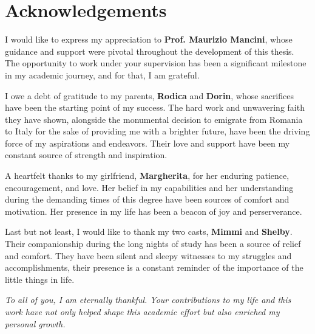 %
%
\chapter*{Acknowledgements}


    I would like to express my appreciation to \textbf{Prof. Maurizio Mancini}, whose guidance
    and support were pivotal throughout the development of this thesis. The opportunity to work under 
    your supervision has been a significant milestone in my academic journey, and for that, I am grateful.  
   
    \vspace{2mm} 
    
    \noindent I owe a debt of gratitude to my parents, \textbf{Rodica} and \textbf{Dorin}, whose 
    sacrifices have been the starting point of my success. The hard work and unwavering faith they have
    shown, alongside the monumental decision to emigrate from Romania to Italy for the sake of 
    providing me with a brighter future, have been the driving force of my aspirations and endeavors. 
    Their love and support have been my constant source of strength and inspiration.
    
    \vspace{2mm}

    \noindent A heartfelt thanks to my girlfriend, \textbf{Margherita}, for her enduring patience, 
    encouragement, and love. Her belief in my capabilities and her understanding during the demanding 
    times of this degree have been sources of comfort and motivation. Her presence in my life has been
    a beacon of joy and perserverance.

    \vspace{2mm}
  
    \noindent Last but not least, I would like to thank my two casts, \textbf{Mimmi} and
    \textbf{Shelby}. Their companionship during the long nights of study has been a source of relief and comfort. They have been silent and sleepy witnesses to my struggles and accomplishments, their presence is a constant reminder of the importance of the little things in life.

    \vspace{2mm}

    \textit{To all of you, I am eternally thankful. Your contributions to my life and this work have
    not only helped shape this academic effort but also enriched my personal growth.}